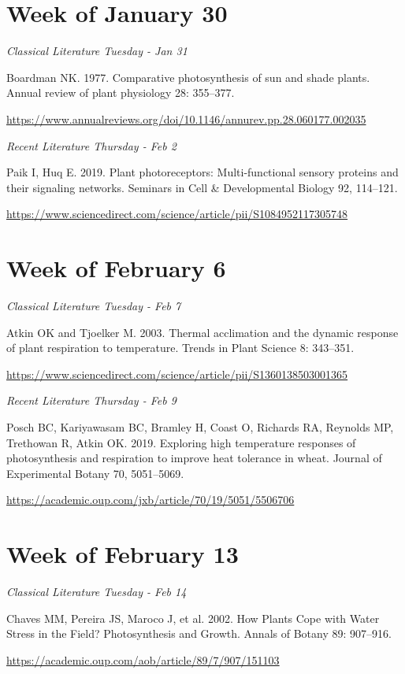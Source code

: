 \documentclass[12pt, notitlepage]{article}   	%
\begin{document}
{\section*{Week of January 30}
\textit{Classical Literature Tuesday - Jan 31} \par
Boardman NK. 1977. Comparative photosynthesis of sun and shade plants. 
Annual review of plant physiology 28: 355–377. \par
\url{https://www.annualreviews.org/doi/10.1146/annurev.pp.28.060177.002035}

\textit{Recent Literature Thursday - Feb 2} \par
Paik I, Huq E. 2019. Plant photoreceptors: Multi-functional sensory proteins and 
their signaling networks. Seminars in Cell & Developmental Biology 92, 114–121.\par
\url{https://www.sciencedirect.com/science/article/pii/S1084952117305748}

\section*{Week of February 6}
\textit{Classical Literature Tuesday - Feb 7} \par
Atkin OK and Tjoelker M. 2003. Thermal acclimation and the dynamic response of plant 
respiration to temperature. Trends in Plant Science 8: 343–351. \par
\url{https://www.sciencedirect.com/science/article/pii/S1360138503001365}

\textit{Recent Literature Thursday - Feb 9} \par
Posch BC, Kariyawasam BC, Bramley H, Coast O, Richards RA, Reynolds MP, Trethowan R, 
Atkin OK. 2019. Exploring high temperature responses of photosynthesis and respiration 
to improve heat tolerance in wheat. Journal of Experimental Botany 70, 5051–5069. \par
\url{https://academic.oup.com/jxb/article/70/19/5051/5506706}

\section*{Week of February 13}
\textit{Classical Literature Tuesday - Feb 14} \par
Chaves MM, Pereira JS, Maroco J, et al. 2002. How Plants Cope with Water Stress 
in the Field? Photosynthesis and Growth. Annals of Botany 89: 907–916. \par
\url{https://academic.oup.com/aob/article/89/7/907/151103}

}
\end{document}
